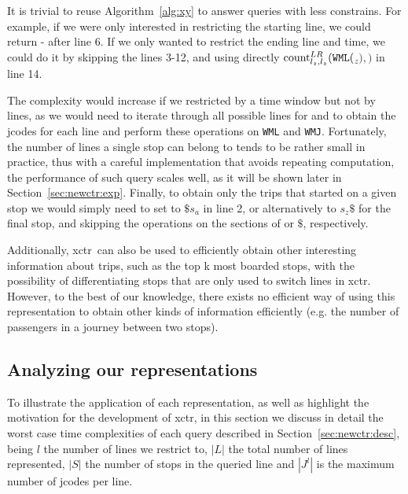     It is trivial to reuse Algorithm~\ref{alg:xy} to answer queries with less constrains. For example, if we were only interested in restricting the starting line, we could return - after line 6. If we only wanted to restrict the ending line and time, we could do it by skipping the lines 3-12, and using directly $\cnt^{LR}_{l_z,l_z}(\FuncSty{WML}($$_z),$$)$ in line 14. 
    
    The complexity would increase if we restricted by a time window but not by lines, as we would need to iterate through all possible lines for  and  to obtain the jcodes for each line and perform these operations on \texttt{WML} and \texttt{WMJ}. Fortunately, the number of lines a single stop can belong to tends to be rather small in practice, thus with a careful implementation that avoids repeating computation, the performance of such query scales well, as it will be shown later in Section~\ref{sec:newctr:exp}. Finally, to obtain only the trips that started on a given stop we would simply need to set  to $\$s_a$ in line 2, or alternatively to $s_z\$$ for the final stop, and skipping the operations on the sections of  or $\$$, respectively.
    
    \medskip
    Additionally, \gls{xctr}~can also be used to efficiently obtain other interesting information about trips, such as the top k most boarded stops, 
    with the possibility of differentiating stops that are only used to switch lines in \gls{xctr}. However, to the best of our knowledge, there exists no efficient way of using this representation to obtain other kinds of information efficiently (e.g. the number of passengers in a journey between two stops).
	
	\subsection{Analyzing our representations}
	\label{sec:newctr:algo:analysis}
	To illustrate the application of each representation, as well as highlight the motivation for the development of \gls{xctr}, in this section we discuss in detail the worst case time complexities of each query described in Section~\ref{sec:newctr:desc}, being $l$ the number of lines we restrict to, $|L|$ the total number of lines represented, $|S|$ the number of stops in the queried line and $|J^l|$ is the maximum number of jcodes per line.
    
